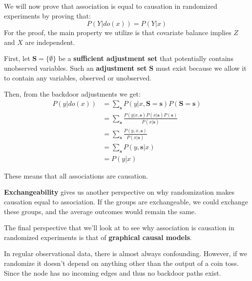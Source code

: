 We will now prove that association is equal to causation in randomized experiments
by proving that:
\begin{equation*}
    P(Y|do(x)) = P(Y|x)
\end{equation*}
For the proof, the main property we utilize is that covariate balance implies
$Z$ and $X$ are independent.

First, let $\mathbf{S} = \{\emptyset\}$ be a \textbf{sufficient adjustment set}
that potentially contains unobserved variables. Such an \textbf{adjustment set}
$\mathbf{S}$ must exist because we allow it to contain any variables, observed
or unobserved.

Then, from the backdoor adjustments we get:
\begin{equation}
    \begin{array}{ll}
        P(y|do(x)) & = \sum_{\mathbf{s}} P(y|x, \mathbf{S} = \mathbf{s})P(\mathbf{S} = \mathbf{s})                \\
                   & = \sum_{\mathbf{s}} \frac{P(y|x, \mathbf{s})P(x|\mathbf{s})P(\mathbf{s})}{P(x | \mathbf{s})} \\
                   & = \sum_{\mathbf{s}} \frac{P(y, x, \mathbf{s})}{P(x | \mathbf{s})}                            \\
                   & = \sum_{\mathbf{s}} P(y, \mathbf{s}| x)                                                      \\
                   & = P(y | x)
    \end{array}
\end{equation}

These means that all associations are causation.

\textbf{Exchangeability} gives us another perspective on why randomization makes
causation equal to association. If the groups are exchangeable, we could exchange
these groups, and the average outcomes would remain the same.

The final perspective that we'll look at to see why association is causation in
randomized experiments is that of \textbf{graphical causal models}.

In regular observational data, there is almost always confounding. However, if we
randomize it doesn't depend on anything other than the output of a coin toss.
Since the node has no incoming edges and thus no backdoor paths exist.